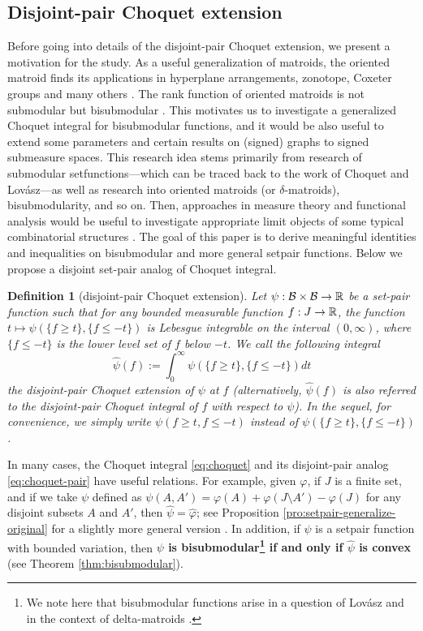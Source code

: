 \documentclass[12pt,a4paper]{article}
\newtheorem{defn}[theorem]{Definition}
\begin{document}
\subsection{Disjoint-pair Choquet extension}

Before going into details of the disjoint-pair Choquet extension, we present a motivation for the study.  
As a useful generalization of matroids, the oriented matroid finds its applications in hyperplane arrangements, zonotope, Coxeter groups and many others \cite{orientedmatroid}. 
The rank function of oriented matroids is not submodular but bisubmodular \cite{Chandrasekaran}. 
%
This motivates us to investigate a generalized Choquet integral for bisubmodular functions, and it would be also useful to extend some parameters and certain results on (signed) graphs to signed submeasure spaces. %
This research idea stems primarily from research of submodular setfunctions—which can be traced back to the work of Choquet and Lov\'asz—as well as research into oriented matroids (or $\delta$-matroids),  bisubmodularity, and so on. 
Then, approaches in measure theory and functional analysis would be useful to investigate appropriate limit objects of some typical combinatorial structures \cite{BCLSV}. 
The goal of this paper is to derive meaningful identities and inequalities on bisubmodular and more general setpair functions. 
%
Below we propose a disjoint set-pair analog of Choquet integral. 
\begin{defn}[disjoint-pair Choquet extension]
Let 
$\psi:\mathcal{B}\times\mathcal{B}\to\mathbb{R}$ be a set-pair function such that for any bounded measurable function $f:J\to\mathbb{R}$, the function $t\mapsto \psi(\{f\ge t\},\{f\le-t\})$ is Lebesgue integrable on the interval $(0,\infty)$, where  $\{f\le-t\}$ is the lower level set of $f$ below $-t$. 
We call the following integral 
\begin{equation}\label{eq:choquet-pair}
\widehat{\psi}(f):=\int_0^\infty \psi(\{f\ge t\},\{f\le-t\})dt 
\end{equation}
the \emph{disjoint-pair Choquet extension} of $\psi$ at $f$ (alternatively, $\widehat{\psi}(f)$ is also referred to the \emph{disjoint-pair Choquet integral} of $f$ with respect to $\psi$). 
In the sequel, for convenience, we simply write $\psi(f\ge t,f\le -t)$ instead of $\psi(\{f\ge t\},\{f\le-t\})$.
\end{defn}

In many cases, the Choquet integral \eqref{eq:choquet} and its disjoint-pair analog \eqref{eq:choquet-pair} have useful relations. For example, given $\varphi$, if $J$ is a finite set, and if we take $\psi$ defined as  $\psi(A,A')=\varphi(A)+\varphi(J\setminus A')-\varphi(J)$ for any disjoint subsets $A$ and $A'$, then $\widehat{\psi}=\widehat{\varphi}$; see Proposition \ref{pro:setpair-generalize-original} for a slightly more general version%
. In addition, if $\psi$ is a setpair function with bounded variation, then {\bf$\psi$ is bisubmodular\footnote{We note here that bisubmodular functions arise in a question of Lov\'asz \cite{Lovasz83} and in the context of delta-matroids \cite{Bouchet}. } if and only if $\widehat{\psi}$ is convex} (see Theorem \ref{thm:bisubmodular}). 
\end{document}

